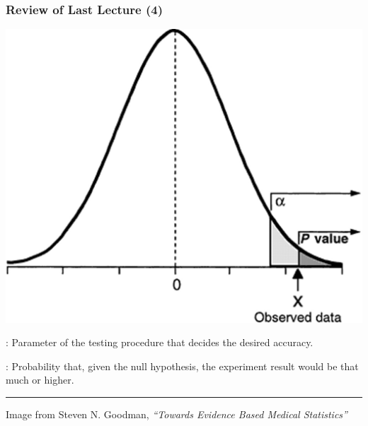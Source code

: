 \documentclass[10pt]{beamer}
\begin{document}
\begin{frame}
  \frametitle{Review of Last Lecture (4)}
  \vspace{.3cm}
  \includegraphics[width=.5\textwidth]{img/pvalue}

  \bigskip

  : Parameter of the testing procedure that
  decides the desired accuracy.

  \smallskip

  : Probability that, given the null hypothesis, the
  experiment result would be that much or higher.

  \hrule
  \hfill\tiny{Image from Steven N. Goodman, \emph{``Towards Evidence Based Medical Statistics''}}
\end{frame}
\end{document}
